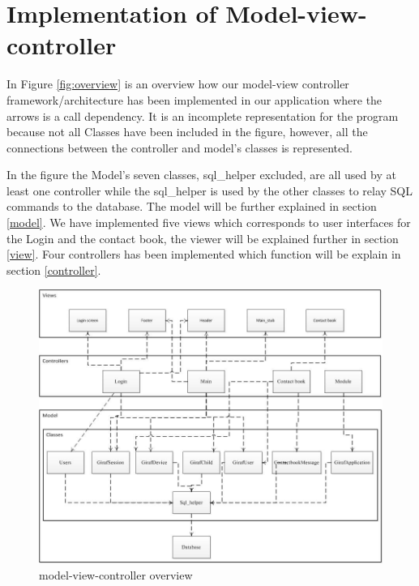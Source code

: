 \section{Implementation of Model-view-controller}
In Figure \vref{fig:overview} is an overview how our model-view controller framework/architecture has been implemented in our application where the arrows is a call dependency. It is an incomplete representation for the program because not all Classes have been included in the figure, however, all the connections between the controller and model's classes is represented. 

In the figure the Model's seven classes, sql\_helper excluded, are all used by at least one controller while the sql\_helper is used by the other classes to relay SQL commands to the database. The model will be further explained in section \vref{model}. We have implemented five views which corresponds to user interfaces for the Login and the contact book, the viewer will be explained further in section \vref{view}. Four controllers has been implemented which function will be explain in section \vref{controller}.

\begin{figure}
	\centering
		\includegraphics[width=1.00\textwidth]{img/overview.jpg}
	\caption{model-view-controller overview}
	\label{fig:overview}
\end{figure}
